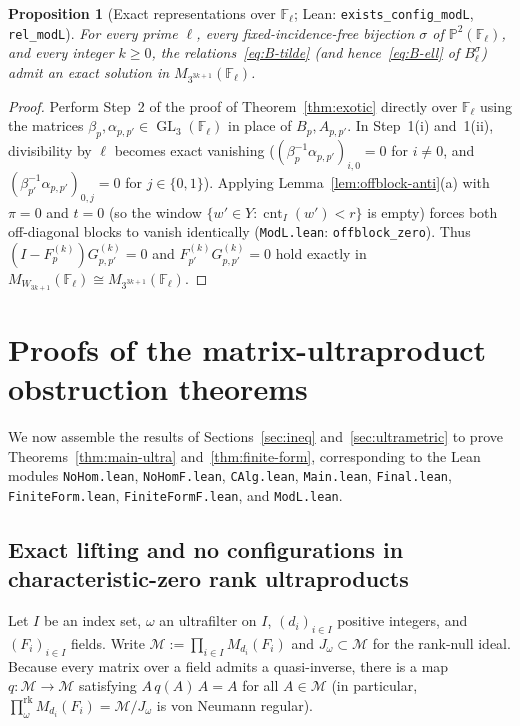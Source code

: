 \documentclass[11pt]{article}
\newtheorem{proposition}[theorem]{Proposition}
\theoremstyle{definition}
\theoremstyle{remark}
\numberwithin{equation}{section}
\DeclareMathOperator{\cnt}{cnt}
\DeclareMathOperator{\GL}{GL}
\newcommand{\RUF}[3]{\prod_{#1}^{\mathrm{rk}} M_{#2}(#3)}
\newcommand{\F}{\mathbb{F}}
\newcommand{\1}{\mathbf{1}}
\newcommand{\code}[1]{{\normalfont\small\texttt{#1}}}
\begin{document}
\begin{proposition}[Exact representations over $\F_\ell$; Lean: \code{exists\_config\_modL}, \code{rel\_modL}]
\label{prop:modL}
For every prime $\ell$, every fixed-incidence-free bijection $\sigma$ of $\mathbb{P}^2(\F_\ell)$, and every integer $k \ge 0$, the relations~\eqref{eq:B-tilde} (and hence~\eqref{eq:B-ell} of $B_\ell^\sigma$) admit an exact solution in $M_{3^{3k+1}}(\F_\ell)$.
\end{proposition}

\begin{proof}
Perform Step~2 of the proof of Theorem~\ref{thm:exotic} directly over $\F_\ell$ using the matrices $\beta_p, \alpha_{p,p'} \in \GL_3(\F_\ell)$ in place of $B_p, A_{p,p'}$. In Step~1(i) and~1(ii), divisibility by $\ell$ becomes exact vanishing ($(\beta_p^{-1}\alpha_{p,p'})_{i,0} = 0$ for $i \neq 0$, and $(\beta_{p'}^{-1}\alpha_{p,p'})_{0,j} = 0$ for $j \in \{0,1\}$). Applying Lemma~\ref{lem:offblock-anti}(a) with $\pi = 0$ and $t = 0$ (so the window $\{w' \in Y : \cnt_I(w') < r\}$ is empty) forces both off-diagonal blocks to vanish identically (\code{ModL.lean}: \code{offblock\_zero}). Thus $(I - F_p^{(k)}) G_{p,p'}^{(k)} = 0$ and $F_{p'}^{(k)} G_{p,p'}^{(k)} = 0$ hold exactly in $M_{W_{3k+1}}(\F_\ell) \cong M_{3^{3k+1}}(\F_\ell)$.
\end{proof}

\section{Proofs of the matrix-ultraproduct obstruction theorems}
\label{sec:proofs}

We now assemble the results of Sections~\ref{sec:ineq} and~\ref{sec:ultrametric} to prove Theorems~\ref{thm:main-ultra} and~\ref{thm:finite-form}, corresponding to the Lean modules \code{NoHom.lean}, \code{NoHomF.lean}, \code{CAlg.lean}, \code{Main.lean}, \code{Final.lean}, \code{FiniteForm.lean}, \code{FiniteFormF.lean}, and \code{ModL.lean}.

\subsection{Exact lifting and no configurations in characteristic-zero rank ultraproducts}

Let $I$ be an index set, $\omega$ an ultrafilter on $I$, $(d_i)_{i \in I}$ positive integers, and $(F_i)_{i \in I}$ fields. Write $\mathcal{M} := \prod_{i \in I} M_{d_i}(F_i)$ and $J_\omega \subset \mathcal{M}$ for the rank-null ideal. Because every matrix over a field admits a quasi-inverse, there is a map $q\colon \mathcal{M} \to \mathcal{M}$ satisfying $A\, q(A)\, A = A$ for all $A \in \mathcal{M}$ (in particular, $\RUF{\omega}{d_i}{F_i} = \mathcal{M}/J_\omega$ is von Neumann regular).
\end{document}
